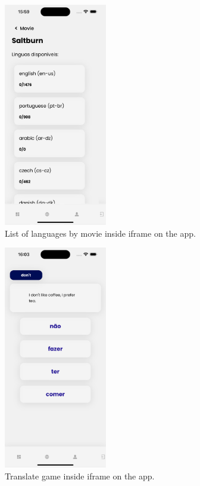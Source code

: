 \documentclass[12pt]{article}
\begin{document}
  \begin{figure}[h]
    \centering
    \caption{
     List of languages by movie inside iframe on the app.
    }
    \label{fig:app5}
    \includegraphics[width=0.4\textwidth]{assets/18.png}
  \end{figure}

  \begin{figure}[h]
    \centering
    \caption{
     Translate game inside iframe on the app.
    }
    \label{fig:app6}
    \includegraphics[width=0.4\textwidth]{assets/19.png}
  \end{figure}
\end{document}
